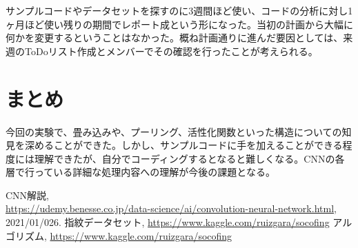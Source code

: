 \documentclass[a4paper, 11pt, titlepage]{jsarticle}
\begin{document}
サンプルコードやデータセットを探すのに3週間ほど使い、コードの分析に対し1ヶ月ほど使い残りの期間でレポート成という形になった。当初の計画から大幅に何かを変更するということはなかった。概ね計画通りに進んだ要因としては、来週のToDoリスト作成とメンバーでその確認を行ったことが考えられる。

\section{まとめ}
今回の実験で、畳み込みや、プーリング、活性化関数といった構造についての知見を深めることができた。しかし、サンプルコードに手を加えることができる程度には理解できたが、自分でコーディングするとなると難しくなる。CNNの各層で行っている詳細な処理内容への理解が今後の課題となる。

\begin{thebibliography}{n}
   CNN解説, \\
  \url{https://udemy.benesse.co.jp/data-science/ai/convolution-neural-network.html}, 2021/01/026.
  指紋データセット, 
  \url{https://www.kaggle.com/ruizgara/socofing}
  アルゴリズム, \url{https://www.kaggle.com/ruizgara/socofing}
  \bibitem{}
\end{thebibliography}
\end{document}
